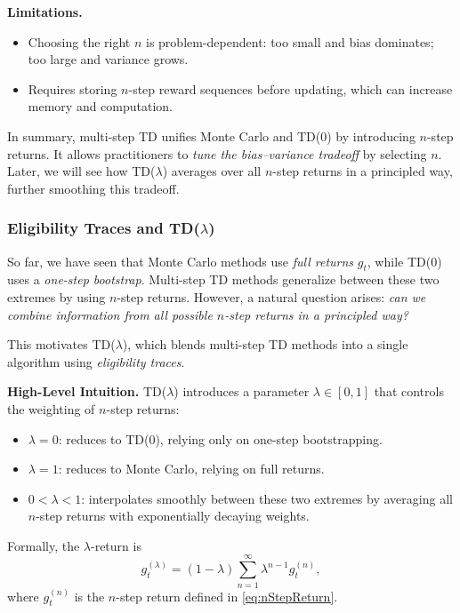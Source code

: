 \documentclass[
]{book}
\theoremstyle{definition}
\theoremstyle{definition}
\theoremstyle{definition}
\theoremstyle{definition}
\theoremstyle{remark}
\begin{document}
\textbf{Limitations.}

\begin{itemize}
\item
  Choosing the right \(n\) is problem-dependent: too small and bias dominates; too large and variance grows.
\item
  Requires storing \(n\)-step reward sequences before updating, which can increase memory and computation.
\end{itemize}

In summary, multi-step TD unifies Monte Carlo and TD(0) by introducing \(n\)-step returns. It allows practitioners to \emph{tune the bias--variance tradeoff} by selecting \(n\). Later, we will see how TD(\(\lambda\)) averages over all \(n\)-step returns in a principled way, further smoothing this tradeoff.

\subsubsection{\texorpdfstring{Eligibility Traces and TD(\(\lambda\))}{Eligibility Traces and TD(\textbackslash lambda)}}\label{eligibility-traces-and-tdlambda}

So far, we have seen that Monte Carlo methods use \emph{full returns} \(g_t\), while TD(0) uses a \emph{one-step bootstrap}. Multi-step TD methods generalize between these two extremes by using \(n\)-step returns. However, a natural question arises: \emph{can we combine information from all possible \(n\)-step returns in a principled way?}

This motivates TD(\(\lambda\)), which blends multi-step TD methods into a single algorithm using \emph{eligibility traces}.

\textbf{High-Level Intuition.} TD(\(\lambda\)) introduces a parameter \(\lambda \in [0,1]\) that controls the weighting of \(n\)-step returns:

\begin{itemize}
\item
  \(\lambda = 0\): reduces to TD(0), relying only on one-step bootstrapping.
\item
  \(\lambda = 1\): reduces to Monte Carlo, relying on full returns.
\item
  \(0 < \lambda < 1\): interpolates smoothly between these two extremes by averaging all \(n\)-step returns with exponentially decaying weights.
\end{itemize}

Formally, the \(\lambda\)-return is
\begin{equation}
g_t^{(\lambda)} = (1-\lambda) \sum_{n=1}^{\infty} \lambda^{n-1} g_t^{(n)},
\label{eq:LambdaReturn}
\end{equation}
where \(g_t^{(n)}\) is the \(n\)-step return defined in \eqref{eq:nStepReturn}.
\end{document}
